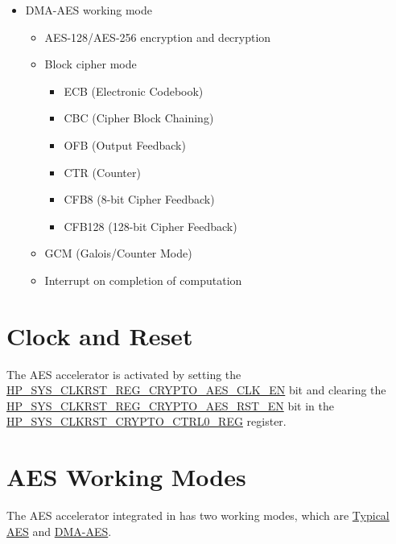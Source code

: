 \documentclass[main\_\_EN.tex]{subfiles}
\begin{document}
    \begin{itemize}
    \item DMA-AES working mode
        \begin{itemize}
            \item AES-128/AES-256 encryption and decryption
            \item Block cipher mode
                \begin{itemize}
                    \item ECB (Electronic Codebook)
                    \item CBC (Cipher Block Chaining)
                    \item OFB (Output Feedback)
                    \item CTR (Counter)
                    \item CFB8 (8-bit Cipher Feedback)
                    \item CFB128 (128-bit Cipher Feedback)
                \end{itemize}
            \item GCM (Galois/Counter Mode)
            \item Interrupt on completion of computation
        \end{itemize}
    \end{itemize}

\section{Clock and Reset}

The AES accelerator is activated by setting the \hyperref[fielddesc:HPSYSCLKRSTREGCRYPTOAESCLKEN]{HP\_SYS\_CLKRST\_REG\_CRYPTO\_AES\_CLK\_EN} bit and clearing the \hyperref[fielddesc:HPSYSCLKRSTREGCRYPTOAESRSTEN]{HP\_SYS\_CLKRST\_REG\_CRYPTO\_AES\_RST\_EN} bit in the \hyperref[regdesc:HPSYSCLKRSTCRYPTOCTRL0REG]{HP\_SYS\_CLKRST\_CRYPTO\_CTRL0\_REG} register.


\section{AES Working Modes}

The AES accelerator integrated in \chipname{} has two working modes, which are \hyperref[sec:aes-typical-modes]{Typical AES} and \hyperref[sec:aes-dma-aes]{DMA-AES}.
\end{document}
